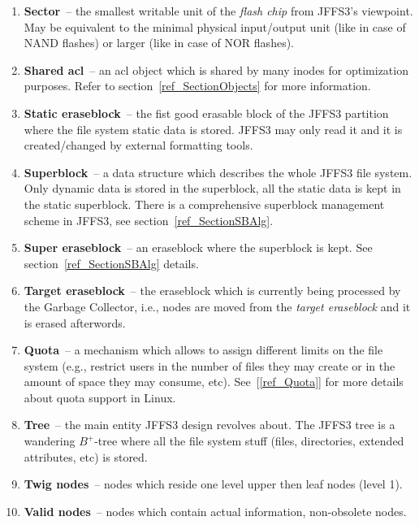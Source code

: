 \begin{enumerate}
\item \textbf{Sector}~-- the smallest writable unit of the \emph{flash chip}
from JFFS3's viewpoint. May be equivalent to the minimal physical input/output
unit (like in case of NAND flashes) or larger (like in case of NOR flashes).

\item \textbf{Shared acl}~-- an acl object which is shared by many inodes for
optimization purposes. Refer to section~\ref{ref_SectionObjects} for more
information.

\item \textbf{Static eraseblock}~-- the fist good erasable block of the JFFS3
partition where the file system static data is stored. JFFS3 may
only read it and it is created/changed by external formatting tools.

\item \textbf{Superblock}~-- a data structure which describes the whole
JFFS3 file system. Only dynamic data is stored in the superblock, all the
static data is kept in the static superblock. There is a comprehensive
superblock management scheme in JFFS3, see section~\ref{ref_SectionSBAlg}.

\item \textbf{Super eraseblock}~-- an eraseblock where the superblock is kept.
See section~\ref{ref_SectionSBAlg} details.

\item \textbf{Target eraseblock}~-- the eraseblock which is currently being
processed by the Garbage Collector, i.e., nodes are moved from the \emph{target
eraseblock} and it is erased afterwords.

\item \textbf{Quota}~-- a mechanism which allows to assign different limits on
the file system (e.g., restrict users in the number of files they may create or
in the amount of space they may consume, etc). See~[\ref{ref_Quota}] for more
details about quota support in Linux.

\item \textbf{Tree}~-- the main entity JFFS3 design revolves about. The JFFS3
tree is a wandering \mbox{$B^+$-tree} where all the file system stuff (files,
directories, extended attributes, etc) is stored.

\item \textbf{Twig nodes}~-- nodes which reside one level upper then leaf nodes
(level 1).

\item \textbf{Valid nodes}~-- nodes which contain actual information,
non-obsolete nodes.


\end{enumerate}

